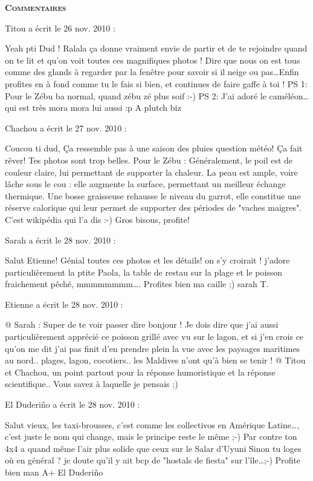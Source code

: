 \bigskip
\textbf{\textsc{Commentaires}}

\medskip
Titou a écrit le 26 nov. 2010 :
\begin{displayquote}
Yeah pti Dud !
Ralala ça donne vraiment envie de partir et de te rejoindre quand on te lit et qu'on voit toutes ces magnifiques photos !
Dire que nous on est tous comme des glands à regarder par la fenêtre pour savoir si il neige ou pas\dots Enfin profites en à fond comme tu le fais si bien, et continues de faire gaffe à toi !
PS 1: Pour le Zébu ba normal, quand zébu zé plus soif :-)
PS 2: J'ai adoré le caméléon\dots qui est très mora mora lui aussi :p
A plutch
biz
\end{displayquote}

\medskip
Chachou a écrit le 27 nov. 2010 :
\begin{displayquote}
Coucou ti dud,
Ça ressemble pas à une saison des pluies question météo! Ça fait rêver! Tes photos sont trop belles.
Pour le Zébu : Généralement, le poil est de couleur claire, lui permettant de supporter la chaleur. La peau est ample, voire lâche sous le cou : elle augmente la surface, permettant un meilleur échange thermique.
Une bosse graisseuse rehausse le niveau du garrot, elle constitue une réserve calorique qui leur permet de supporter des périodes de "vaches maigres". C'est wikipédia qui l'a dis :-)
Gros bisous, profite!
\end{displayquote}

\medskip
Sarah a écrit le 28 nov. 2010 :
\begin{displayquote}
Salut Etienne!
Génial toutes ces photos et les détails!
on s'y croirait !
j'adore particulièrement la ptite Paola, la table de restau sur la plage et le poisson fraichement pêché, mmmmmmmm\dots.
Profites bien ma caille ;)
sarah T.
\end{displayquote}

\medskip
Etienne a écrit le 28 nov. 2010 :
\begin{displayquote}
@ Sarah : Super de te voir passer dire bonjour ! Je dois dire que j'ai aussi particulièrement apprécié ce poisson grillé avec vu sur le lagon, et si j'en crois ce qu'on me dit j'ai pas finit d'en prendre plein la vue avec les paysages maritimes au nord.. plages, lagon, cocotiers.. les Maldives n'ont qu'à bien se tenir !
@ Titou et Chachou, un point partout pour la réponse humoristique et la réponse scientifique.. Vous savez à laquelle je pensais ;)
\end{displayquote}

\medskip
El Duderiño a écrit le 28 nov. 2010 :
\begin{displayquote}
Salut vieux,
les taxi-brousses, c'est comme les collectivos en Amérique Latine\dots, c'est juste le nom qui change, mais le principe reste le même ;-)
Par contre ton 4x4 a quand même l'air plus solide que ceux sur le Salar d'Uyuni
Sinon tu loges où en général ? je doute qu'il y ait bcp de "hostals de fiesta" sur l'île\dots ;-)
Profite bien man
A+
El Duderiño
\end{displayquote}


